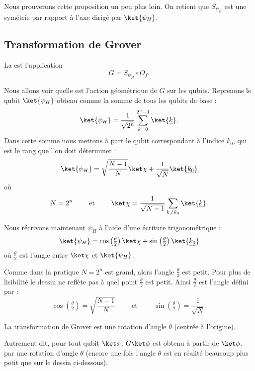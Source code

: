 \documentclass[11pt,class=report,crop=false]{standalone}
\begin{document}
Nous prouverons cette proposition un peu plus loin. On retient que $S_{\psi_H}$ est une symétrie par rapport à l'axe dirigé par $\ket{\psi_H}$.





\subsection{Transformation de Grover}

La  est l'application 
$$G = S_{\psi_H} \circ O_f.$$


Nous allons voir quelle est l'action géométrique de $G$ sur les qubits.
Reprenons le qubit $\ket{\psi_H}$ obtenu comme la somme de tous les qubits de base :
$$\ket{\psi_H} = \frac{1}{\sqrt{2^n}} \sum_{k=0}^{2^n-1} \ket{\underline{k}}.$$
Dans cette somme nous mettons à part le qubit correspondant à l'indice $k_0$, qui est le rang que l'on doit déterminer :
$$\ket{\psi_H} = \sqrt{\frac{N-1}{N}} \ket\chi + \frac{1}{\sqrt{N}} \ket{\underline{k_0}}$$
où
$$N = 2^n \qquad \text{ et } \qquad  \ket\chi = \frac{1}{\sqrt{N-1}} \sum_{k\neq k_0} \ket{\underline{k}}.$$

Nous récrivons maintenant $\psi_H$ à l'aide d'une écriture trigonométrique :
$$\ket{\psi_H} = \cos\left(\tfrac\theta2\right) \ket\chi + \sin\left(\tfrac\theta2\right) \ket{\underline{k_0}}$$
où $\frac\theta2$ est l'angle entre $\ket\chi$ et $\ket{\psi_H}$.


Comme dans la pratique $N=2^n$ est grand, alors l'angle $\frac\theta2$ est petit. Pour plus de lisibilité le dessin ne reflète pas à quel point $\frac\theta2$ est petit.
Ainsi $\frac\theta2$ est l'angle défini par :
$$\cos \left(\tfrac\theta2\right) = \sqrt{\frac{N-1}{N}}\qquad \text{ et } \qquad \sin \left(\tfrac\theta2\right) = \frac{1}{\sqrt{N}}.$$

\begin{proposition}
La transformation de Grover est une rotation d'angle $\theta$ (centrée à l'origine).
\end{proposition}

Autrement dit, pour tout qubit $\ket\phi$, $G\ket\phi$ est obtenu à partir de $\ket\phi$, par une rotation d'angle $\theta$ (encore une fois l'angle $\theta$ est en réalité beaucoup plus petit que sur le dessin ci-dessous).
\end{document}
